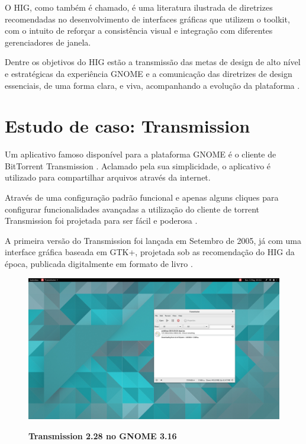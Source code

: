 O HIG, como também é chamado, é uma literatura ilustrada de diretrizes
recomendadas no desenvolvimento de interfaces gráficas que utilizem o toolkit,
com o intuito de reforçar a consistência visual e integração com diferentes
gerenciadores de janela. 

Dentre os objetivos do HIG estão a transmissão das metas de design de alto nível
e estratégicas da experiência GNOME e a comunicação das diretrizes de design
essenciais, de uma forma clara, e viva, acompanhando a evolução da plataforma
.

\section{Estudo de caso: Transmission}

Um aplicativo famoso disponível para a plataforma GNOME é o cliente de
BitTorrent Transmission \cite{transmission282}. Aclamado pela sua simplicidade,
o aplicativo é utilizado para compartilhar arquivos através da internet.

Através de uma configuração padrão funcional e apenas alguns cliques para
configurar funcionalidades avançadas a utilização do cliente de torrent
Transmission foi projetada para ser fácil e poderosa \cite{transmission-about}.

A primeira versão do Transmission foi lançada em Setembro de 2005, já com uma
interface gráfica baseada em GTK+, projetada sob as recomendação do HIG
da época, publicada digitalmente em formato de livro \cite{gnome221hig}.

\begin{figure}[htb]
  \begin{center}
    \caption{\textbf{Transmission 2.28 no GNOME 3.16}}
    \includegraphics [width=\textwidth]{image/transmission/282-master/main-window.png}
    \label{transmission-master}
  \end{center}
\end{figure}
